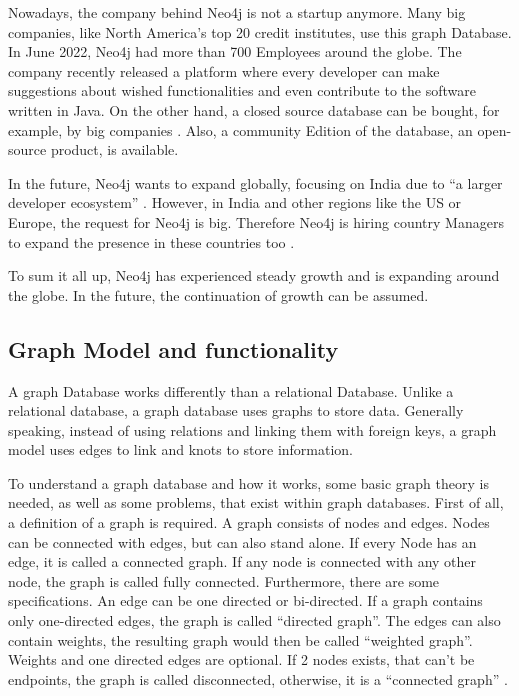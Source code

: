 Nowadays, the company behind Neo4j is not a startup anymore. Many big companies, like North America's top 20 credit institutes, use this graph Database. In June 2022, Neo4j had more than 700 Employees around the globe.
The company recently released a platform where every developer can make suggestions about wished functionalities and even contribute
to the software written in Java. On the other hand, a closed source database can be bought, for example, by big companies \parencite{historyneo4j}. Also, a community Edition of the database, an open-source product, is available.

In the future, Neo4j wants to expand globally, focusing on India due to \enquote{a larger developer ecosystem} \parencite{historyneo4j}. However, in India and other regions like the US or Europe, the request 
for Neo4j is big. Therefore Neo4j is hiring country Managers to expand the presence in these countries too \parencite{historyneo4j}.

To sum it all up, Neo4j has experienced steady growth and is expanding around the globe. In the future, the continuation of growth can be assumed.

\subsection{Graph Model and functionality} \label{subsec:graphModelFunctionalityNeo4j}

A graph Database works differently than a relational Database. Unlike a relational database, a graph database uses graphs to store data. Generally speaking, instead of using relations and linking them with foreign keys, a graph model uses edges to link and knots to store information.

To understand a graph database and how it works, some basic graph theory is needed, as well as some problems, that exist within graph databases. First of all, a definition of a graph is required. A graph consists of nodes and edges. Nodes can be connected with edges, but can also stand alone. If every Node has an edge, it is called a connected graph. If any node is connected with any other node, the graph is called fully connected.
Furthermore, there are some specifications. An edge can be one directed or bi-directed. If a graph contains only one-directed edges, the graph is called \enquote{directed graph}. The edges can also contain weights, the resulting graph would then be called \enquote{weighted graph}. Weights and one directed edges are optional. If 2 nodes exists, that can't be endpoints, the graph is called disconnected, otherwise, it is a \enquote{connected graph} \parencite{graphBasics}.

